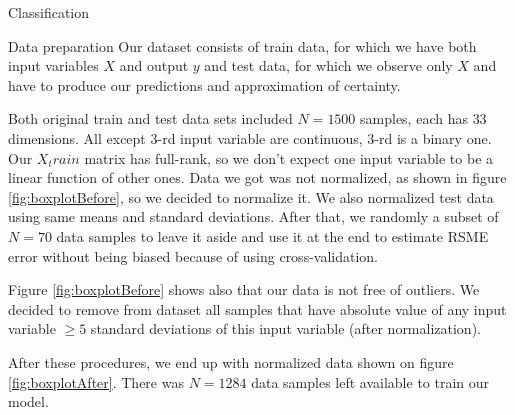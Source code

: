 \documentclass{article}
\begin{document}
\begin{section}{Classification}
\begin{subsection}{Data preparation}
Our dataset consists of train data, for which we have both input variables $X$ and output $y$ and test data, for which we observe only $X$ and have to produce our predictions and approximation of certainty.

Both original train and test data sets included $N=1500$ samples, each has $33$ dimensions. All except $3$-rd input variable are continuous, $3$-rd is a binary one. Our $X_train$ matrix has full-rank, so we don't expect one input variable to be a linear function of other ones. 
Data we got was not normalized, as shown in figure \ref{fig:boxplotBefore}, so we decided to normalize it. We also normalized test data using same means and standard deviations. After that, we randomly a subset of $N=70$ data samples to leave it aside and use it at the end to estimate RSME error without being biased because of using cross-validation. 

Figure \ref{fig:boxplotBefore} shows also that our data is not free of outliers. We decided to remove from dataset all samples that have absolute value of any input variable $\ge 5$ standard deviations of this input variable (after normalization).

After these procedures, we end up with normalized data shown on figure \ref{fig:boxplotAfter}. There was $N=1284$ data samples left available to train our model.

\begin{figure}[!h]
\center
{}
\hfill
{}
\caption{}
\end{figure}


\end{subsection}
\end{section}
\end{document}
